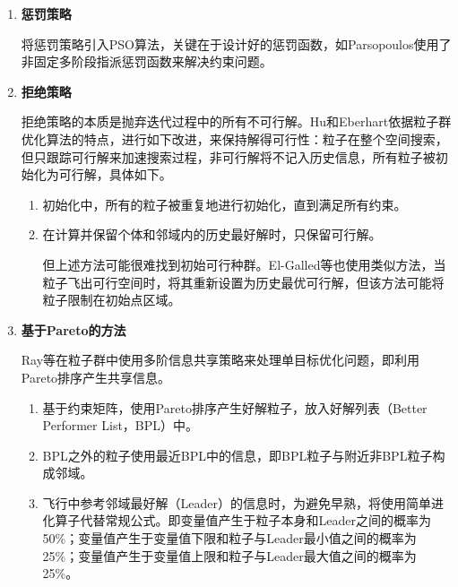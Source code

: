 \begin{enumerate}
	\item \textbf{惩罚策略}
	
	将惩罚策略引入PSO算法，关键在于设计好的惩罚函数，如Parsopoulos使用了非固定多阶段指派惩罚函数来解决约束问题。
	\item \textbf{拒绝策略}
	
	拒绝策略的本质是抛弃迭代过程中的所有不可行解。Hu和Eberhart依据粒子群优化算法的特点，进行如下改进，来保持解得可行性：粒子在整个空间搜索，但只跟踪可行解来加速搜索过程，非可行解将不记入历史信息，所有粒子被初始化为可行解，具体如下。
	
	\begin{enumerate}
		\item 初始化中，所有的粒子被重复地进行初始化，直到满足所有约束。
		\item 在计算并保留个体和邻域内的历史最好解时，只保留可行解。
		
		但上述方法可能很难找到初始可行种群。El-Galled等也使用类似方法，当粒子飞出可行空间时，将其重新设置为历史最优可行解，但该方法可能将粒子限制在初始点区域。
	\end{enumerate}
\item \textbf{基于Pareto的方法}

Ray等在粒子群中使用多阶信息共享策略来处理单目标优化问题，即利用Pareto排序产生共享信息。
\begin{enumerate}
	\item 基于约束矩阵，使用Pareto排序产生好解粒子，放入好解列表（Better Performer List，BPL）中。
	\item BPL之外的粒子使用最近BPL中的信息，即BPL粒子与附近非BPL粒子构成邻域。
	\item 飞行中参考邻域最好解（Leader）的信息时，为避免早熟，将使用简单进化算子代替常规公式。即变量值产生于粒子本身和Leader之间的概率为50\%；变量值产生于变量值下限和粒子与Leader最小值之间的概率为25\%；变量值产生于变量值上限和粒子与Leader最大值之间的概率为25\%。
\end{enumerate}
\end{enumerate}
